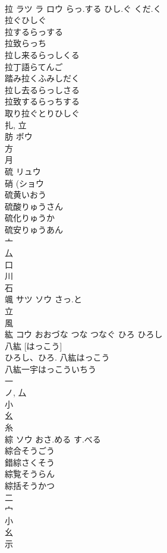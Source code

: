 \documentclass[8pt]{extreport}
\begin{document}
\begin{CJK}{UTF8}{min}
\\	拉	ラツ ラ ロウ	らっ.する ひし.ぐ くだ.く	
\\	拉ぐひしぐ 
\\	拉するらっする 
\\	拉致らっち 
\\	拉し来るらっしくる 
\\	拉丁語らてんご 
\\	踏み拉くふみしだく 
\\	拉し去るらっしさる 
\\	拉致するらっちする 
\\	取り拉ぐとりひしぐ 
\\	扎, 立 
\\	肪	ボウ		
\\	方 
\\	月 
\\	硫	リュウ		
\\	硝 (ショウ 
\\	硫黄いおう 
\\	硫酸りゅうさん 
\\	硫化りゅうか 
\\	硫安りゅうあん 
\\	亠 
\\	厶 
\\	口 
\\	川 
\\	石 
\\	颯	サツ ソウ	さっ.と	
\\	立 
\\	風 
\\	紘	コウ	おおづな つな つなぐ ひろ ひろし	
\\	八紘 [はっこう] 
\\	ひろし、ひろ.		八紘はっこう 
\\	八紘一宇はっこういちう 
\\	一 
\\	ノ, 厶 
\\	小 
\\	幺 
\\	糸 
\\	綜	ソウ	おさ.める す.べる	
\\	綜合そうごう 
\\	錯綜さくそう 
\\	綜覧そうらん 
\\	綜括そうかつ 
\\	二 
\\	宀 
\\	小 
\\	幺 
\\	示 

\end{CJK}
\end{document}
